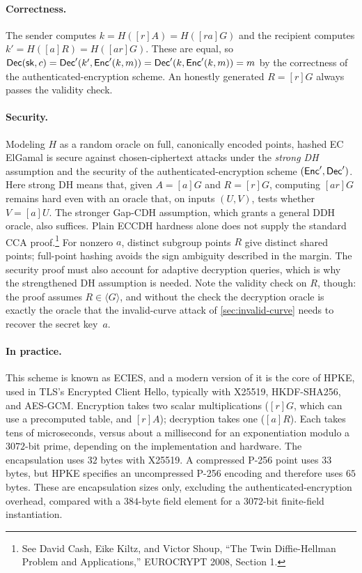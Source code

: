\paragraph{Correctness.}
The sender computes $k = H([r]A) = H([ra]G)$ and the recipient computes
$k' = H([a]R) = H([ar]G)$.
These are equal, so
$\mathsf{Dec}({\mathsf{sk}}, c) = \mathsf{Dec}'(k', \mathsf{Enc}'(k, m)) = \mathsf{Dec}'(k, \mathsf{Enc}'(k, m)) = m$
by the correctness of the authenticated-encryption scheme.
An honestly generated $R = [r]G$ always passes the validity check.

\paragraph{Security.}
Modeling $H$ as a random oracle on full, canonically encoded points,
hashed EC ElGamal is secure against chosen-ciphertext attacks under the
\emph{strong DH} assumption and the security of the authenticated-encryption
scheme $(\mathsf{Enc}', \mathsf{Dec}')$. Here strong DH means that, given $A=[a]G$ and
$R=[r]G$, computing $[ar]G$ remains hard even with an oracle that, on
inputs $(U,V)$, tests whether $V=[a]U$. The stronger Gap-CDH assumption,
which grants a general DDH oracle, also suffices. Plain ECCDH hardness
alone does not supply the standard CCA proof.\footnote{See David Cash,
Eike Kiltz, and Victor Shoup, ``The Twin Diffie-Hellman Problem and
Applications,'' EUROCRYPT 2008, Section 1.}
For nonzero $a$, distinct subgroup points $R$ give distinct shared points;
full-point hashing avoids the sign ambiguity described in the margin.
The security proof must also account for adaptive decryption queries,
which is why the strengthened DH assumption is needed.
Note the validity check on $R$, though: the proof assumes
$R \in \langle G \rangle$, and without the check the decryption oracle is
exactly the oracle that the invalid-curve attack of
\cref{sec:invalid-curve} needs to recover the secret key~$a$.

\paragraph{In practice.}
This scheme is known as ECIES, and a modern version of it is the core
of HPKE,\autocite{HPKE} used in TLS's Encrypted Client Hello, typically
with X25519, HKDF-SHA256, and AES-GCM.
Encryption takes two scalar multiplications ($[r]G$, which can use a
precomputed table, and $[r]A$); decryption takes one ($[a]R$). Each takes
tens of microseconds, versus about a millisecond for an exponentiation
modulo a $3072$-bit prime, depending on the implementation and hardware.
The encapsulation uses $32$ bytes with X25519. A compressed P-256 point
uses $33$ bytes, but HPKE specifies an uncompressed P-256 encoding and
therefore uses $65$ bytes. These are encapsulation sizes only, excluding
the authenticated-encryption overhead, compared with a $384$-byte field
element for a $3072$-bit finite-field instantiation.
